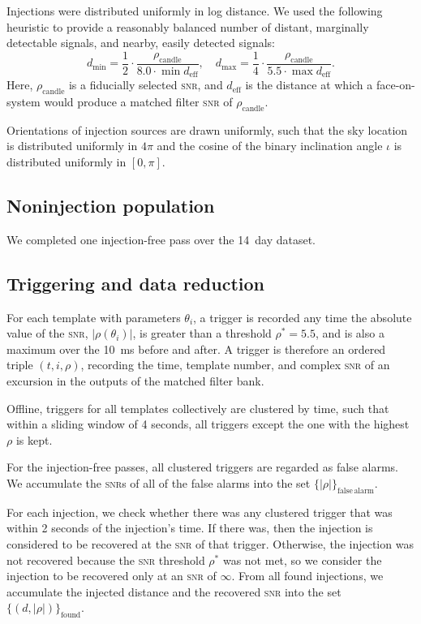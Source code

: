 Injections were distributed uniformly in log distance.  We used the following heuristic to provide a reasonably balanced number of distant, marginally detectable signals, and nearby, easily detected signals:
$$
d_\mathrm{min} = \frac{1}{2} \cdot \frac{\rho_\mathrm{candle}}{8.0 \cdot \min {d_\mathrm{eff}}}, \quad
d_\mathrm{max} = \frac{1}{4} \cdot \frac{\rho_\mathrm{candle}}{5.5 \cdot \max {d_\mathrm{eff}}}.
$$
Here, $\rho_\mathrm{candle}$ is a fiducially selected \textsc{snr}, and $d_\mathrm{eff}$ is the distance at which a face-on-system would produce a matched filter \textsc{snr} of $\rho_\mathrm{candle}$.

Orientations of injection sources are drawn uniformly, such that the sky location is distributed uniformly in $4\pi$ and the cosine of the binary inclination angle $\iota$ is distributed uniformly in $[0, \pi]$.

\subsection{Noninjection population}

We completed one injection-free pass over the 14~day dataset. 

\subsection{Triggering and data reduction}

For each template with parameters $\theta_i$, a trigger is recorded any time the absolute value of the \textsc{snr}, $|\rho(\theta_i)|$, is greater than a threshold $\rho^* = 5.5$, and is also a maximum over the 10~ms before and after.  A trigger is therefore an ordered triple $(t, i, \rho)$, recording the time, template number, and complex \textsc{snr} of an excursion in the outputs of the matched filter bank.

Offline, triggers for all templates collectively are clustered by time, such that within a sliding window of 4 seconds, all triggers except the one with the highest $\rho$ is kept.

For the injection-free passes, all clustered triggers are regarded as false alarms.  We accumulate the \textsc{snr}s of all of the false alarms into the set $\{|\rho|\}_\mathrm{false\,alarm}$.

For each injection, we check whether there was any clustered trigger that was within 2 seconds of the injection's time.  If there was, then the injection is considered to be recovered at the \textsc{snr} of that trigger.  Otherwise, the injection was not recovered because the \textsc{snr} threshold $\rho^*$ was not met, so we consider the injection to be recovered only at an \textsc{snr} of $\infty$.  From all found injections, we accumulate the injected distance and the recovered \textsc{snr} into the set $\{(d, |\rho|)\}_\mathrm{found}$.

